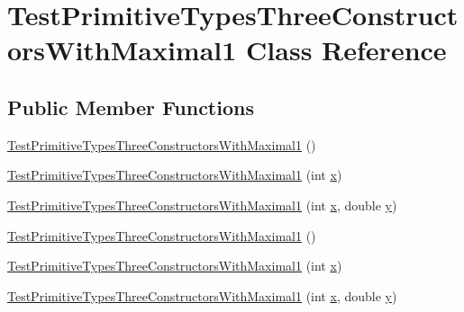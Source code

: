 \hypertarget{classTestPrimitiveTypesThreeConstructorsWithMaximal1}{
\section{TestPrimitiveTypesThreeConstructorsWithMaximal1 Class Reference}
\label{classTestPrimitiveTypesThreeConstructorsWithMaximal1}
}
\subsection*{Public Member Functions}
\begin{DoxyCompactItemize}
\item 
\hyperlink{classTestPrimitiveTypesThreeConstructorsWithMaximal1_a9045916b19d60980dc02f65ffb497527}{TestPrimitiveTypesThreeConstructorsWithMaximal1} ()
\item 
\hyperlink{classTestPrimitiveTypesThreeConstructorsWithMaximal1_a29c2bbf52c73c16c586618f3eacb3b1b}{TestPrimitiveTypesThreeConstructorsWithMaximal1} (int \hyperlink{classTestPrimitiveTypesThreeConstructorsWithMaximal1_adeba66696c73b0cd2fb6df35f456042a}{x})
\item 
\hyperlink{classTestPrimitiveTypesThreeConstructorsWithMaximal1_ab956f64c4788229a7a248ea585cefa9a}{TestPrimitiveTypesThreeConstructorsWithMaximal1} (int \hyperlink{classTestPrimitiveTypesThreeConstructorsWithMaximal1_adeba66696c73b0cd2fb6df35f456042a}{x}, double \hyperlink{classTestPrimitiveTypesThreeConstructorsWithMaximal1_a2394335cbd3f9e110a4a07ed5352672c}{y})
\item 
\hyperlink{classTestPrimitiveTypesThreeConstructorsWithMaximal1_a9045916b19d60980dc02f65ffb497527}{TestPrimitiveTypesThreeConstructorsWithMaximal1} ()
\item 
\hyperlink{classTestPrimitiveTypesThreeConstructorsWithMaximal1_a29c2bbf52c73c16c586618f3eacb3b1b}{TestPrimitiveTypesThreeConstructorsWithMaximal1} (int \hyperlink{classTestPrimitiveTypesThreeConstructorsWithMaximal1_adeba66696c73b0cd2fb6df35f456042a}{x})
\item 
\hyperlink{classTestPrimitiveTypesThreeConstructorsWithMaximal1_ab956f64c4788229a7a248ea585cefa9a}{TestPrimitiveTypesThreeConstructorsWithMaximal1} (int \hyperlink{classTestPrimitiveTypesThreeConstructorsWithMaximal1_adeba66696c73b0cd2fb6df35f456042a}{x}, double \hyperlink{classTestPrimitiveTypesThreeConstructorsWithMaximal1_a2394335cbd3f9e110a4a07ed5352672c}{y})
\end{DoxyCompactItemize}
